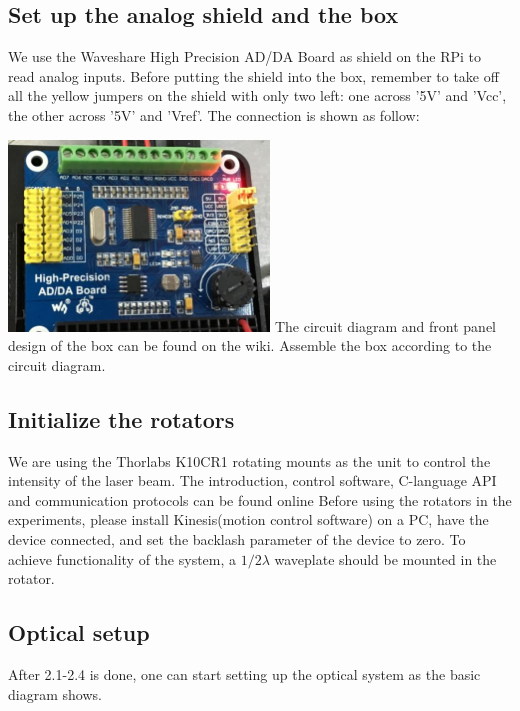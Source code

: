 \documentclass{article}
\begin{document}
\subsection{Set up the analog shield and the box}
We use the Waveshare High Precision AD/DA Board as shield on the RPi to read analog inputs. \newline\newline
Before putting the shield into the box, remember to take off all the yellow jumpers on the shield with only two left: one across '5V' and 'Vcc', the other across '5V' and 'Vref'. The connection is shown as follow:\newline

\includegraphics[height=2in]{rp1.JPG}\newline
The circuit diagram and front panel design of the box can be found on the wiki. Assemble the box according to the circuit diagram.
\subsection{Initialize the rotators}
We are using the Thorlabs K10CR1 rotating mounts as the unit to control the intensity of the laser beam.\newline\newline
The introduction, control software, C-language API and communication protocols can be found online\newline\newline
Before using the rotators in the experiments, please install Kinesis(motion control software) on a PC, have the device connected, and set the backlash parameter of the device to zero.\newline\newline
To achieve functionality of the system, a $1/2\lambda$ waveplate should be mounted in the rotator.
\subsection{Optical setup}
After 2.1-2.4 is done, one can start setting up the optical system as the basic diagram shows. 
\end{document}
